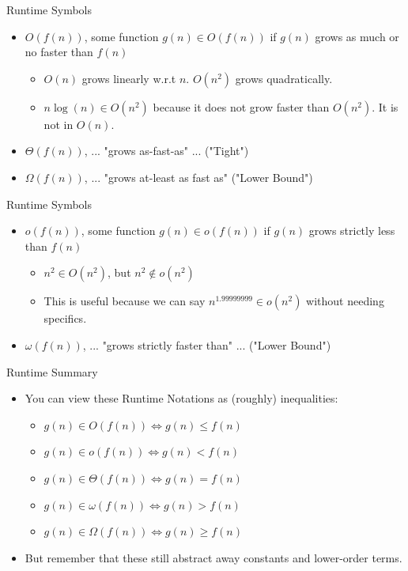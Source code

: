 \documentclass[aspectratio=169]{beamer}
\begin{document}
\begin{frame}{Runtime Symbols}
    \begin{itemize}
        \item $O(f(n))$, some function $g(n) \in O(f(n))$ if $g(n)$ grows as much or no faster than $f(n)$ \pause
        \begin{itemize}
            \item $O(n)$ grows linearly w.r.t $n$. $O(n^2)$ grows quadratically. \pause
            \item $n \log (n) \in O(n^2)$ because it does not grow faster than $O(n^2)$. It is not in $O(n)$. \pause
        \end{itemize}
        \item $\Theta(f(n))$, ... "grows as-fast-as" ... ("Tight") \pause
        \item $\Omega(f(n))$, ... "grows at-least as fast as"  ("Lower Bound")
    \end{itemize}
\end{frame}

\begin{frame}{\small{Runtime Symbols}}
    \begin{itemize}
        \item $o(f(n))$, some function $g(n) \in o(f(n))$ if $g(n)$ grows strictly less than $f(n)$ \pause
        \begin{itemize}
            \item $n^2 \in O(n^2)$, but $n^2 \not \in o(n^2)$ \pause
            \item This is useful because we can say $n^{1.99999999} \in o(n^2)$ without needing specifics. \pause
        \end{itemize}
        \item $\omega(f(n))$, ... "grows strictly faster than" ...  ("Lower Bound")
    \end{itemize}
\end{frame}

\begin{frame}{Runtime Summary}
    \begin{itemize}
        \item You can view these Runtime Notations as (roughly) inequalities:
        \begin{itemize}
            \item $g(n) \in O( f(n) ) \iff g(n) \leq f(n)$
            \item $g(n) \in  o( f(n) ) \iff g(n) < f(n)$
            \item $g(n) \in  \Theta( f(n) ) \iff g(n) = f(n)$
            \item $g(n) \in  \omega( f(n)) \iff g(n) > f(n)$
            \item $g(n) \in \Omega(f(n)) \iff g(n) \geq f(n)$
        \end{itemize}
        \item But remember that these still abstract away constants and lower-order terms.
    \end{itemize}
\end{frame}
\end{document}
